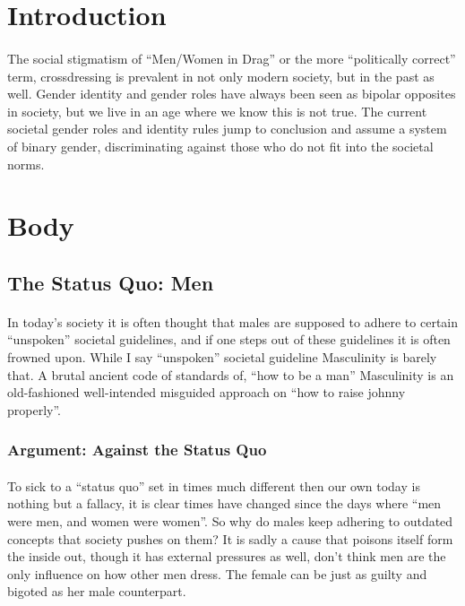 \doublespacing
\section{Introduction}
\paragraph{}
The social stigmatism of ``Men/Women in Drag'' or the more ``politically
correct'' term, crossdressing is prevalent in not only modern society, but in
the past as well. Gender identity and gender roles have always been seen as
bipolar opposites in society, but we live in an age where we know this is not
true. The current societal gender roles and identity rules jump to conclusion
and assume a system of binary gender, discriminating against those who do not
fit into the societal norms.
\par

\section{Body}
\subsection{The Status Quo: Men}
\paragraph{}
In today's society it is often thought that males are supposed to adhere to
certain ``unspoken'' societal guidelines, and if one steps out of these
guidelines it is often frowned upon. While I say ``unspoken'' societal guideline
Masculinity is barely that. A brutal ancient code of standards of, ``how to be a
man'' Masculinity is an old-fashioned well-intended misguided approach on ``how
to raise johnny properly''.
\par

\subsubsection{Argument: Against the Status Quo}
\paragraph{}
To sick to a ``status quo'' set in times much different then our own today is
nothing but a fallacy, it is clear times have changed since the days where ``men
were men, and women were women''. So why do males keep adhering to outdated
concepts that society pushes on them? It is sadly a cause that poisons itself
form the inside out, though it has external pressures as well, don't think men
are the only influence on how other men dress. The female can be just as guilty
and bigoted as her male counterpart.
\par

